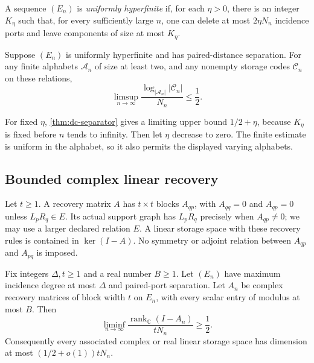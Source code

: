 \begin{definition}
\label{def:dc-hyperfinite-definition}
A sequence $(E_n)$ is \emph{uniformly hyperfinite} if, for each $\eta>0$,
there is an integer $K_\eta$ such that, for every sufficiently large $n$,
one can delete at most $2\eta N_n$ incidence ports and leave components
of size at most $K_\eta$.
\end{definition}

\begin{corollary}
\label{cor:dc-hyperfinite}
Suppose $(E_n)$ is uniformly hyperfinite and has paired-distance separation.
For any finite alphabets $\mathcal A_n$ of size at least two, and any
nonempty storage codes $\mathcal C_n$ on these relations,
\[
 \limsup_{n\to\infty}
 \frac{\log_{|\mathcal A_n|}|\mathcal C_n|}{N_n}\le\frac12.
\]
\end{corollary}
\begin{outline}
For fixed $\eta$, \cref{thm:dc-separator} gives a limiting upper bound
$1/2+\eta$, because $K_\eta$ is fixed before $n$ tends to infinity.
Then let $\eta$ decrease to zero.  The finite estimate is uniform in
the alphabet, so it also permits the displayed varying alphabets.
\end{outline}

\subsection{Bounded complex linear recovery}

Let $t\ge1$.  A recovery matrix $A$ has $t\times t$ blocks $A_{qp}$,
with $A_{qq}=0$ and $A_{qp}=0$ unless $L_pR_q\in E$.
Its actual support graph has $L_pR_q$ precisely when $A_{qp}\ne0$;
we may use a larger declared relation $E$.
A linear storage space with these recovery rules is contained in
$\ker(I-A)$.  No symmetry or adjoint relation between $A_{qp}$ and
$A_{pq}$ is imposed.

\begin{theorem}
\notformalized
\label{thm:dc-complex}
Fix integers $\Delta,t\ge1$ and a real number $B\ge1$.
Let $(E_n)$ have maximum incidence degree at most $\Delta$ and paired-port
separation.  Let $A_n$ be complex recovery matrices of block width $t$
on $E_n$, with every scalar entry of modulus at most $B$.
Then
\begin{equation}
 \liminf_{n\to\infty}
 \frac{\operatorname{rank}_{\mathbb C}(I-A_n)}{tN_n}\ge\frac12.
 \label{eq:dc-complex-rank}
\end{equation}
Consequently every associated complex or real linear storage space has
dimension at most $(1/2+o(1))tN_n$.
\end{theorem}

